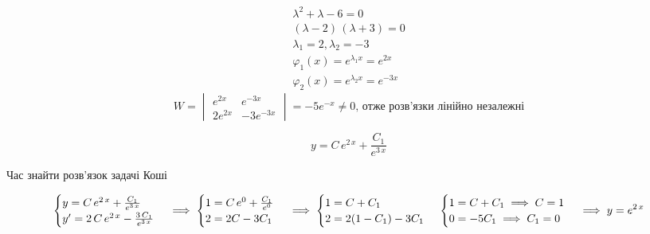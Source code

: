 \documentclass[../rgr_2.tex]{subfiles}
\begin{document}
\Solution

\begin{align}
	\lambda^2+\lambda-6=0 \\
	\left(\lambda-2\right)\,\left(\lambda+3\right)=0 \\
	\lambda_1 = 2,
	\lambda_2 = -3 \\
	\varphi_1(x)=e^{\lambda_1 x}=e^{2x} \\
	\varphi_2(x)=e^{\lambda_2 x}=e^{-3x}
\end{align}
\begin{equation}
	W=
	\begin{vmatrix}
		e^{2x}	&e^{-3x}	\\
		2e^{2x}	&-3e^{-3x}
	\end{vmatrix}
	=-5e^{-x} \neq 0 \text{,~отже розв'язки лінійно незалежні}
\end{equation}

\begin{equation}
	y=C\,{e}^{2\,x}+\frac{C_{1}}{{e}^{3\,x}}
\end{equation}

Час знайти розв'язок задачі Коші

\begin{dmath}
	\begin{cases}
		y=C\,{e}^{2\,x}+\frac{C_{1}}{{e}^{3\,x}} \\
		y'=2\,C\,{e}^{2\,x}-\frac{3\,C_{1}}{{e}^{3\,x}}
	\end{cases}
\implies
	\begin{cases}
		1=C\,{e}^0+\frac{C_{1}}{{e}^0} \\
		2=2C-3C_1
	\end{cases}
\implies
	\begin{cases}
		1=C+C_1 \\
		2=2(1-C_1)-3C_1
	\end{cases}
\\
	\begin{cases}
		1=C+C_1 \implies C=1 \\
		0=-5C_1 \implies C_1=0
	\end{cases}
\implies y={e}^{2\,x}
\end{dmath}

\end{document}
